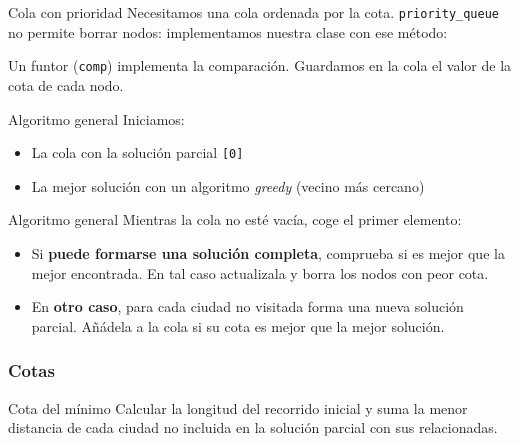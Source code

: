 
\begin{frame}[fragile]{Cola con prioridad}
  Necesitamos una cola ordenada por la cota. \texttt{priority\_queue} no permite borrar nodos: implementamos nuestra clase con ese método:

  

  Un funtor (\texttt{comp}) implementa la comparación. Guardamos en la cola el valor de la cota de cada nodo.

\end{frame}

\begin{frame}{Algoritmo general}
  Iniciamos:
  \begin{itemize}
    \item La cola con la solución parcial \texttt{[0]}
    \item La mejor solución con un algoritmo \textit{greedy} (vecino más cercano)
  \end{itemize}
\end{frame}

\begin{frame}{Algoritmo general}
  Mientras la cola no esté vacía, coge el primer elemento:
  \begin{itemize}
    \item Si \textbf{puede formarse una solución completa}, comprueba si es mejor que la mejor encontrada. En tal caso actualizala y borra los nodos con peor cota.
    \item En \textbf{otro caso}, para cada ciudad no visitada forma una nueva solución parcial. Añádela a la cola si su cota es mejor que la mejor solución.
  \end{itemize}
\end{frame}

\subsubsection{Cotas}

\begin{frame}{Cota del mínimo}
  Calcular la longitud del recorrido inicial y suma la menor distancia de cada ciudad no incluida en la solución parcial con sus relacionadas.
\end{frame}

